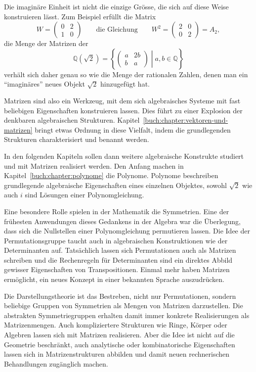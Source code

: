 Die imaginäre Einheit ist nicht die einzige Grösse, die sich auf diese
Weise konstruieren lässt.
Zum Beispiel erfüllt die Matrix
\[
W=\begin{pmatrix} 0&2\\1&0 \end{pmatrix}
\qquad\text{die Gleichung}\qquad
W^2 = \begin{pmatrix} 2&0\\0&2\end{pmatrix} = A_2,
\]
die Menge der Matrizen der 
\[
\mathbb{Q}(\sqrt{2})
=
\left\{\left.
\begin{pmatrix} a&2b\\ b&a\end{pmatrix}
\;\right|\;
a,b\in\mathbb{Q}
\right\}
\]
verhält sich daher genau so wie die Menge der rationalen Zahlen, denen
man ein ``imaginäres'' neues Objekt $\sqrt{2}$ hinzugefügt hat.

Matrizen sind also ein Werkzeug, mit dem sich algebraisches Systeme
mit fast beliebigen Eigenschaften konstruieren lassen.
Dies führt zu einer Explosion der denkbaren algebraischen Strukturen.
Kapitel~\ref{buch:chapter:vektoren-und-matrizen} bringt etwas Ordnung
in diese Vielfalt, indem die grundlegenden Strukturen charakterisiert
und benannt werden.

In den folgenden Kapiteln sollen dann weitere algebraische Konstrukte
studiert und mit Matrizen realisiert werden.
Den Anfang machen in Kapitel~\ref{buch:chapter:polynome} die Polynome.
Polynome beschreiben grundlegende algebraische Eigenschaften eines
einzelnen Objektes, sowohl $\sqrt{2}$ wie auch $i$ sind Lösungen einer
Polynomgleichung.

Eine besondere Rolle spielen in der Mathematik die Symmetrien.
Eine der frühesten Anwendungen dieses Gedankens in der Algebra war
die Überlegung, dass sich die Nullstellen einer Polynomgleichung
permutieren lassen.
Die Idee der Permutationsgruppe taucht auch in algebraischen Konstruktionen
wie der Determinanten auf.
Tatsächlich lassen sich Permutationen auch als Matrizen schreiben
und die Rechenregeln für Determinanten sind ein direktes Abbild
gewisser Eigenschaften von Transpositionen.
Einmal mehr haben Matrizen ermöglicht, ein neues Konzept in einer
bekannten Sprache auszudrücken.

Die Darstellungstheorie ist das Bestreben, nicht nur Permutationen,
sondern beliebige Gruppen von Symmetrien als Mengen von Matrizen
darzustellen.
Die abstrakten Symmetriegruppen erhalten damit immer konkrete 
Realisierungen als Matrizenmengen.
Auch kompliziertere Strukturen wie Ringe, Körper oder Algebren
lassen sich mit Matrizen realisieren.
Aber die Idee ist nicht auf die Geometrie beschränkt, auch analytische
oder kombinatorische Eigenschaften lassen sich in Matrizenstrukturen
abbilden und damit neuen rechnerischen Behandlungen zugänglich
machen.

